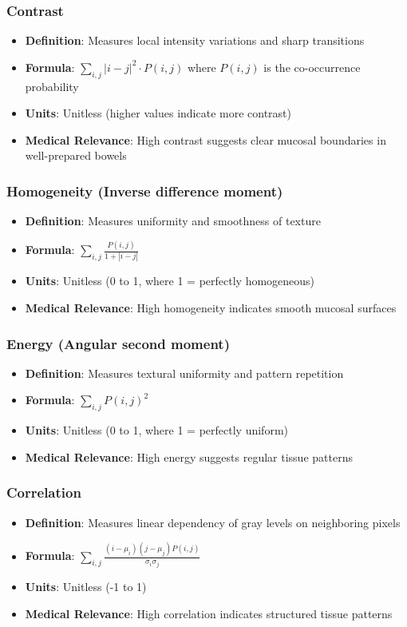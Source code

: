 \documentclass[11pt]{article}
\begin{document}
\subsubsection{Contrast}
\begin{itemize}
    \item \textbf{Definition}: Measures local intensity variations and sharp transitions
    \item \textbf{Formula}: $\displaystyle \sum_{i,j} |i-j|^2 \cdot P(i,j)$ where $P(i,j)$ is the co-occurrence probability
    \item \textbf{Units}: Unitless (higher values indicate more contrast)
    \item \textbf{Medical Relevance}: High contrast suggests clear mucosal boundaries in well-prepared bowels
\end{itemize}

\subsubsection{Homogeneity (Inverse difference moment)}
\begin{itemize}
    \item \textbf{Definition}: Measures uniformity and smoothness of texture
    \item \textbf{Formula}: $\displaystyle \sum_{i,j} \frac{P(i,j)}{1 + |i-j|}$
    \item \textbf{Units}: Unitless (0 to 1, where 1 = perfectly homogeneous)
    \item \textbf{Medical Relevance}: High homogeneity indicates smooth mucosal surfaces
\end{itemize}

\subsubsection{Energy (Angular second moment)}
\begin{itemize}
    \item \textbf{Definition}: Measures textural uniformity and pattern repetition
    \item \textbf{Formula}: $\displaystyle \sum_{i,j} P(i,j)^2$
    \item \textbf{Units}: Unitless (0 to 1, where 1 = perfectly uniform)
    \item \textbf{Medical Relevance}: High energy suggests regular tissue patterns
\end{itemize}

\subsubsection{Correlation}
\begin{itemize}
    \item \textbf{Definition}: Measures linear dependency of gray levels on neighboring pixels
    \item \textbf{Formula}: $\displaystyle \sum_{i,j} \frac{(i-\mu_i)(j-\mu_j)P(i,j)}{\sigma_i\sigma_j}$
    \item \textbf{Units}: Unitless (-1 to 1)
    \item \textbf{Medical Relevance}: High correlation indicates structured tissue patterns
\end{itemize}
\end{document}
